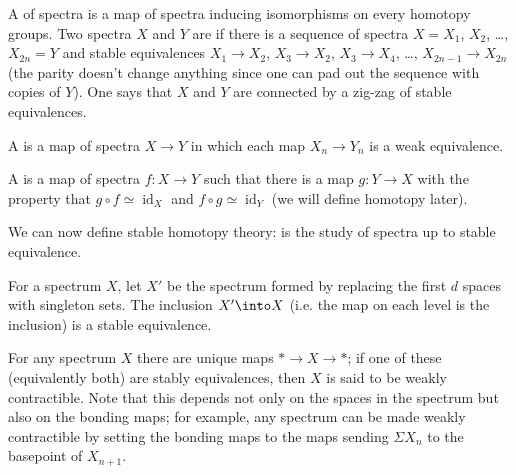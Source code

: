 \documentclass[10pt]{article}
\begin{document}
\begin{definition}
    \label{def:equivalences}
    A  of spectra
    is a map of spectra inducing isomorphisms on every homotopy groups.
    Two spectra $X$ and $Y$ are 
    if there is a sequence of spectra $X = X_1$, $X_2$, \dots, $X_{2n} = Y$
    and stable equivalences $X_1\to X_2$, $X_3\to X_2$, $X_3\to X_4$,
    \dots, $X_{2n-1}\to X_{2n}$ (the parity doesn't change anything
    since one can pad out the sequence with copies of $Y$).
    One says that $X$ and $Y$ are connected by
    a zig-zag of stable equivalences.

    A  is a map of spectra $X\to Y$
    in which each map $X_n\to Y_n$ is a weak equivalence.

    A  is a map of spectra $f\colon X\to Y$
    such that there is a map $g\colon Y\to X$
    with the property that $g\circ f\simeq\operatorname{id}_X$
    and $f\circ g\simeq\operatorname{id}_Y$ (we will define homotopy later).
\end{definition}

We can now define stable homotopy theory:
 is the study of
spectra up to stable equivalence.

\begin{example}
    \label{ex:inclusion-is-stable-equivalence}
    For a spectrum $X$, let $X'$ be the spectrum
    formed by replacing the first $d$ spaces with singleton sets.
    The inclusion $X'\into X$ (i.e. the map on each level is the inclusion)
    is a stable equivalence.
\end{example}

\begin{example}
    \label{ex:weakly-contractible}
    For any spectrum $X$ there are unique maps
    $*\to X\to *$; if one of these (equivalently both)
    are stably equivalences, then $X$ is said to be weakly contractible.
    Note that this depends not only on the spaces in the spectrum
    but also on the bonding maps; for example,
    any spectrum can be made weakly contractible
    by setting the bonding maps to the maps sending $\Sigma X_n$
    to the basepoint of $X_{n+1}$.
\end{example}
\end{document}
